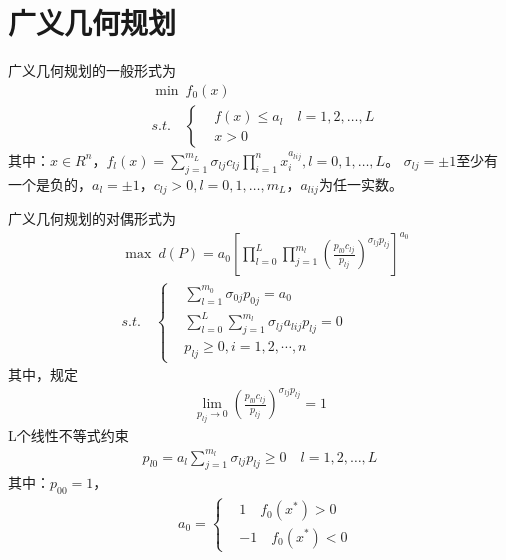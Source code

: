 \section{广义几何规划}
    \par
    广义几何规划的一般形式为
    \begin{align*}
        &\mathop{\min} \  f_0(x)\\
        &s.t.\quad \left\{
        \begin{aligned}
        &f(x) \leqslant a_l\quad l=1,2,\ldots,L \\
        &x>0
        \end{aligned}
            \right.
        \end{align*}
        其中：$x \in R^n$，$f_l(x)=\mathop{\sum}\limits_{j=1}^{m_L}{\sigma}_{lj}c_{lj}\mathop{\prod}\limits_{i=1}^{n}x_i^{a_{lij}},l=0,1,\ldots,L$。
        ${\sigma}_{lj}=\pm 1$至少有一个是负的，$a_l=\pm 1$，$c_{lj}>0,l=0,1,\ldots,m_L$，$a_{lij}$为任一实数。
        \par
        广义几何规划的对偶形式为
        \begin{align}
        \label{广义几何规划的对偶形式1}
        &\mathop{\max} \  d(P)=a_0\left[\mathop{\prod}\limits_{l=0}^{L}\mathop{\prod}\limits_{j=1}^{m_l} \left( \frac{p_{l0}c_{lj}}{p_{lj}} \right) ^{{\sigma}_{lj}p_{lj}}\right]^{a_0}\\
        &s.t.\quad \left\{
        \begin{aligned}
        &\mathop{\sum}\limits_{l=1}^{m_0} {\sigma}_{0j}p_{0j}=a_0\\
        &\mathop{\sum}\limits_{l=0}^{L}\mathop{\sum}\limits_{j=1}^{m_l}{\sigma}_{lj}a_{lij}p_{lj}=0\\
        &p_{lj}\geqslant 0,i=1,2,\cdots,n
        \end{aligned}
        \right.
        \end{align}
        其中，规定
        \begin{align*}
        \mathop{\lim}\limits_{p_{lj}\to 0} \left(\frac{p_{l0}c_{lj}}{p_{lj}}\right)^{{\sigma}_{lj}p_{lj}} =1
        \end{align*}
        L个线性不等式约束
        \begin{align}
            \label{广义几何规划的对偶形式2}
        p_{l0}=a_l\mathop{\sum}\limits_{j=1}^{m_l}{{\sigma}_{lj}p_{lj}} \geqslant 0\quad l=1,2,\ldots,L
        \end{align}
        其中：$p_{00}=1$，
        \begin{align*}
        &a_0=\left\{
        \begin{aligned}
        &1\quad f_0(x^*)>0\\
        &-1\quad f_0(x^*)<0
                \end{aligned}
            \right.
        \end{align*}
